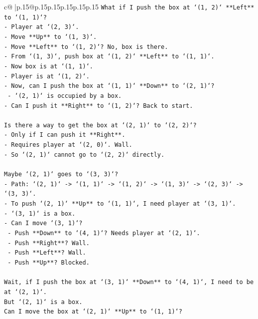 \documentclass{article}
\begin{document}
{\begin{supertabular}{c@{$\;$}|p{.15\linewidth}@{}p{.15\linewidth}p{.15\linewidth}p{.15\linewidth}p{.15\linewidth}p{.15\linewidth}}
{{{\texttt{What if I push the box at `(1, 2)` **Left** to `(1, 1)`?} \\
\texttt{{-} Player at `(2, 3)`.} \\
\texttt{{-} Move **Up** to `(1, 3)`.} \\
\texttt{{-} Move **Left** to `(1, 2)`? No, box is there.} \\
\texttt{{-} From `(1, 3)`, push box at `(1, 2)` **Left** to `(1, 1)`.} \\
\texttt{{-} Now box is at `(1, 1)`.} \\
\texttt{{-} Player is at `(1, 2)`.} \\
\texttt{{-} Now, can I push the box at `(1, 1)` **Down** to `(2, 1)`?} \\
\texttt{  {-} `(2, 1)` is occupied by a box.} \\
\texttt{{-} Can I push it **Right** to `(1, 2)`? Back to start.} \\
\\ 
\texttt{Is there a way to get the box at `(2, 1)` to `(2, 2)`?} \\
\texttt{{-} Only if I can push it **Right**.} \\
\texttt{{-} Requires player at `(2, 0)`. Wall.} \\
\texttt{{-} So `(2, 1)` cannot go to `(2, 2)` directly.} \\
\\ 
\texttt{Maybe `(2, 1)` goes to `(3, 3)`?} \\
\texttt{{-} Path: `(2, 1)` {-}> `(1, 1)` {-}> `(1, 2)` {-}> `(1, 3)` {-}> `(2, 3)` {-}> `(3, 3)`.} \\
\texttt{{-} To push `(2, 1)` **Up** to `(1, 1)`, I need player at `(3, 1)`.} \\
\texttt{{-} `(3, 1)` is a box.} \\
\texttt{{-} Can I move `(3, 1)`?} \\
\texttt{  {-} Push **Down** to `(4, 1)`? Needs player at `(2, 1)`.} \\
\texttt{  {-} Push **Right**? Wall.} \\
\texttt{  {-} Push **Left**? Wall.} \\
\texttt{  {-} Push **Up**? Blocked.} \\
\\ 
\texttt{Wait, if I push the box at `(3, 1)` **Down** to `(4, 1)`, I need to be at `(2, 1)`.} \\
\texttt{But `(2, 1)` is a box.} \\
\texttt{Can I move the box at `(2, 1)` **Up** to `(1, 1)`?} \\
}}}
\end{supertabular}}
\end{document}
